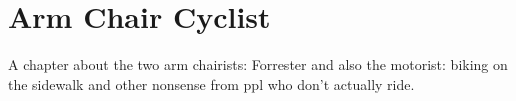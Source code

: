 \chapter{Arm Chair Cyclist}

A chapter about the two arm chairists: Forrester and also the motorist: biking on the sidewalk and other nonsense from ppl who don't actually ride.
